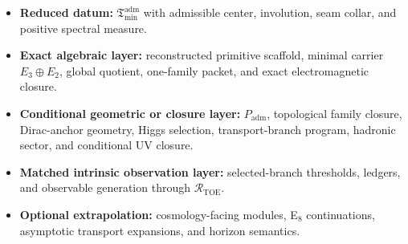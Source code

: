 \documentclass[11pt,a4paper]{article}
\theoremstyle{definition}
\theoremstyle{remark}
\newcommand{\Tmin}{\mathfrak T_{\mathrm{min}}}
\newcommand{\Padm}{P_{\mathrm{adm}}}
\begin{document}
\begin{tcolorbox}[colback=tfptblue!2, colframe=tfptblue!40, breakable,
    title={Datum Hierarchy for the Present Draft}, colbacktitle=tfptblue!60]
\begin{itemize}[leftmargin=1.5em, topsep=3pt, itemsep=3pt]
    \item \textbf{Reduced datum:} $\Tmin^{\mathrm{adm}}$ with admissible center, involution, seam collar, and positive spectral measure.
    \item \textbf{Exact algebraic layer:} reconstructed primitive scaffold, minimal carrier $E_3\oplus E_2$, global quotient, one-family packet, and exact electromagnetic closure.
    \item \textbf{Conditional geometric or closure layer:} $\Padm$, topological family closure, Dirac-anchor geometry, Higgs selection, transport-branch program, hadronic sector, and conditional UV closure.
    \item \textbf{Matched intrinsic observation layer:} selected-branch thresholds, ledgers, and observable generation through $\mathcal R_{\mathrm{TOE}}$.
    \item \textbf{Optional extrapolation:} cosmology-facing modules, E$_8$ continuations, asymptotic transport expansions, and horizon semantics.
\end{itemize}
\end{tcolorbox}
\end{document}
